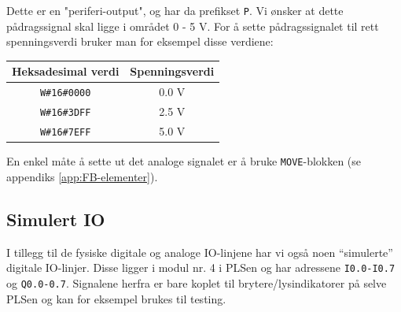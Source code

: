 \begin{alphasection}
Dette er en "periferi-output", og har da prefikset \verb|P|. Vi ønsker at dette pådragssignal skal ligge i området 0 - 5 \si{\V}. For å sette pådragssignalet til rett spenningsverdi bruker man for eksempel disse verdiene:

\begin{center}
 {\begin{tabular}{|c| c|} 
 \hline
 \textbf{Heksadesimal verdi} & \textbf{Spenningsverdi} \\ 
 \toprule
 \verb|W#16#0000| & 0.0 \si{\V} \\ 
 \hline
 \verb|W#16#3DFF| & 2.5 \si{\V}  \\
 \hline
 \verb|W#16#7EFF| & 5.0 \si{\V}  \\

 \toprule
\end{tabular}}
\end{center}



En enkel måte å sette ut det analoge signalet er å bruke \verb|MOVE|-blokken (se appendiks \ref{app:FB-elementer}).
\subsection{Simulert IO}

I tillegg til de fysiske digitale og analoge IO-linjene har vi også noen “simulerte” digitale IO-linjer. Disse ligger i modul nr. 4 i PLSen og har adressene \verb|I0.0-I0.7| og \verb|Q0.0-0.7|. Signalene
herfra er bare koplet til brytere/lysindikatorer på selve PLSen og kan for eksempel brukes til testing.




\end{alphasection}

\setcounter{section}{0}